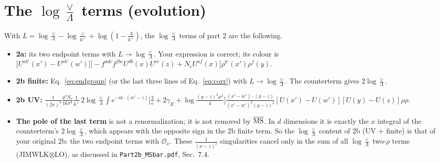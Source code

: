 \documentclass[10pt]{article}
\numberwithin{equation}{section}
\newcommand{\Ox}{\mathcal O_x}
\begin{document}
\section{The \texorpdfstring{$\log\frac{\vee}{\Lambda}$}{log(vee/Lambda)} terms (evolution)}
With $L=\log\frac{\vee}{\Lambda}-\log\frac{\vee}{k^+}+\log(1-\frac{\Lambda}{k^+})$, the $\log\frac{\vee}{\Lambda}$ terms of part 2 are the following.
\begin{itemize}
\item \textbf{2a:} its two endpoint terms with $L\to\log\frac{\vee}{\Lambda}$. Your expression is correct; its colour is $\big[U^{ab'}(x')-U^{ab'}(w')\big]\big[-f^{adc}f^{fbe}U^{db}(x)U^{ce}(z)+N_cU^{af}(x)\big]\rho^{b'}(x')\rho^f(y)$.
\item \textbf{2b finite:} Eq.~\eqref{eq:endgroup} (or the last three lines of Eq.~\eqref{eq:corr}) with $L\to\log\frac{\vee}{\Lambda}$. The counterterm gives $2\log\frac{\vee}{\Lambda}$.
\item \textbf{2b UV:} $\frac{1}{(2\pi)^3}\frac{g^4N_c}{16\pi^4}\frac{1}{k^+}\,2\log\frac{\vee}{\Lambda}\int e^{-ik\cdot(w'-z)}\big[\frac2\epsilon+2\gamma_E+\log\frac{(y-z)^2\mu^2}{4}\big]\frac{(x'-w')\cdot(y-z)}{(x'-w')^2(y-z)^2}[U(x')-U(w')][U(y)-U(z)]\rho\rho$.
\item \textbf{The pole of the last term} is not a renormalization; it is not removed by $\overline{\rm MS}$. In $d$ dimensions it is exactly the $x$ integral of the counterterm's $2\log\frac{\vee}{\Lambda}$, which appears with the opposite sign in the 2b finite term. So the $\log\frac{\vee}{\Lambda}$ content of 2b (UV + finite) is that of your original 2b: the two endpoint terms with $\Ox$. These $\frac{1}{(x-z)^2}$ singularities cancel only in the sum of all $\log\frac{\vee}{\Lambda}$ two-$\rho$ terms (JIMWLK$\otimes$LO), as discussed in \texttt{Part2b\_MSbar.pdf}, Sec.~7.4.
\end{itemize}

\end{document}

